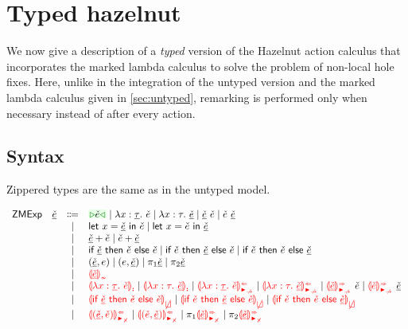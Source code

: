 \documentclass[formalism.tex]{subfiles}
\begin{document}






\section{Typed hazelnut}
\label{sec:typed}
We now give a description of a \emph{typed} version of the Hazelnut action calculus that
incorporates the marked lambda calculus to solve the problem of non-local hole fixes. Here, unlike
in the integration of the untyped version and the marked lambda calculus given in
\cref{sec:untyped}, remarking is performed only when necessary instead of after every action.

\nomechanization{}

\subsection{Syntax}
\label{sec:typed-syntax}
Zippered types are the same as in the untyped model.

\[\begin{array}{rrcl}
  \ZCMName & \ZCMV & \Coloneqq & \ZCCursor{\ECMV} \mid \ZCLamT{x}{\ZTMV}{\ECMV} \mid \ZCLamE{x}{\TMV}{\ZCMV} \mid \ZCApL{\ZCMV}{\ECMV} \mid \ZCApR{\ECMV}{\ZCMV} \\
           &       & \mid         & \ZCLetL{x}{\ZCMV}{\ECMV} \mid \ZCLetR{x}{\ECMV}{\ZCMV} \\
           &       & \mid         & \ZCPlusL{\ZCMV}{\ECMV} \mid \ZCPlusR{\ECMV}{\ZCMV} \\
           &       & \mid         & \ZCIfC{\ZCMV}{\ECMV}{\ECMV} \mid \ZCIfL{\ECMV}{\ZCMV}{\ECMV} \mid \ZCIfR{\ECMV}{\ECMV}{\ZCMV} \\
           &       & \mid         & \ZCPairL{\ZCMV}{\EMV} \mid \ZCPairR{\EMV}{\ZCMV} \mid \ZCProjL{\ZCMV} \mid \ZCProjR{\ZCMV} \\
           &       & \mid         & \ZCInconType{\ZCMV} \\
           &       & \mid         & \ZCLamInconAscT{x}{\ZTMV}{\ECMV} \mid \ZCLamInconAscE{x}{\TMV}{\ZCMV}
                     \mid           \ZCLamAnaNonMatchedArrowT{x}{\ZTMV}{\ECMV} \mid \ZCLamAnaNonMatchedArrowE{x}{\TMV}{\ZCMV}
                     \mid           \ZCApSynNonMatchedArrowL{\ZCMV}{\ECMV} \mid \ZCApSynNonMatchedArrowR{\ECMV}{\ZCMV} \\
           &       & \mid         & \ZCInconBrC{\ZCMV}{\ECMV}{\ECMV} \mid \ZCInconBrL{\ECMV}{\ZCMV}{\ECMV} \mid \ZCInconBrR{\ECMV}{\ECMV}{\ZCMV} \\
           &       & \mid         & \ZCPairAnaNonMatchedProdL{\ZCMV}{\ECMV} \mid \ZCPairAnaNonMatchedProdR{\ECMV}{\ZCMV}
                     \mid           \ZCProjLSynNonMatchedProd{\ZCMV} \mid \ZCProjRSynNonMatchedProd{\ZCMV}
\end{array}\]
\end{document}
